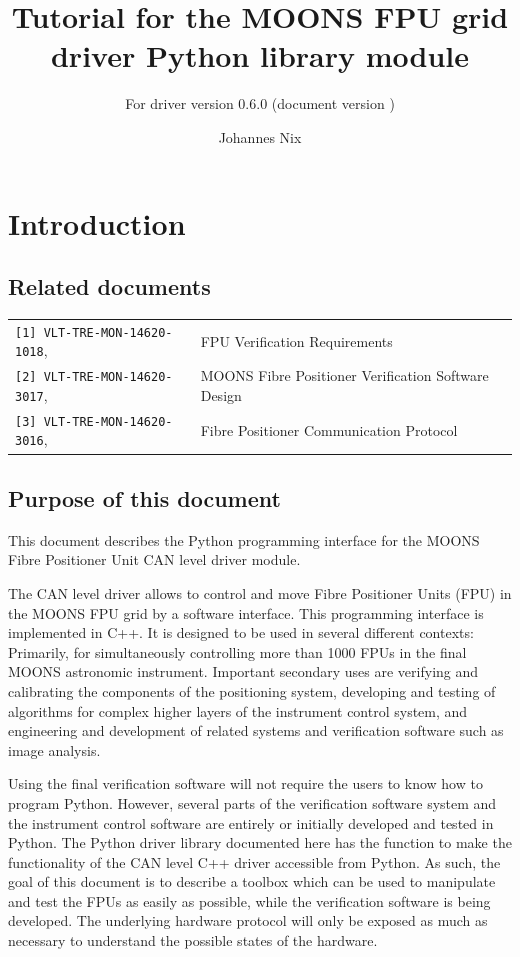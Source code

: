 \documentclass[11pt,a4paper]{scrartcl}
\begin{document}
\title{Tutorial for the MOONS FPU grid driver Python library
  module} \subtitle{For driver version 0.6.0 (document version \texttt{})}

\author{Johannes Nix}

\maketitle

\tableofcontents


\section{Introduction}
\subsection{Related documents}

\begin{tabular}{|ll|}
  \hline
\verb+[1] VLT-TRE-MON-14620-1018+, &  FPU Verification Requirements \\
\verb+[2] VLT-TRE-MON-14620-3017+, & MOONS Fibre Positioner Verification Software Design \\
\verb+[3] VLT-TRE-MON-14620-3016+, & Fibre Positioner Communication Protocol\\
\hline
\end{tabular}


\subsection{Purpose of this document}
This document describes the Python programming interface for the MOONS
Fibre Positioner Unit CAN level driver module.

The CAN level driver allows to control and move Fibre Positioner Units
(FPU) in the MOONS FPU grid by a software interface. This programming
interface is implemented in C++. It is designed to be used in several
different contexts: Primarily, for simultaneously controlling more
than 1000 FPUs in the final MOONS astronomic instrument. Important
secondary uses are verifying and calibrating the components of the
positioning system, developing and testing of algorithms for complex
higher layers of the instrument control system, and engineering and
development of related systems and verification software such as image
analysis.

Using the final verification software will not require the users to
know how to program Python.  However, several parts of the
verification software system and the instrument control software are
entirely or initially developed and tested in Python.  The Python
driver library documented here has the function to make the
functionality of the CAN level C++ driver accessible from Python. As
such, the goal of this document is to describe a toolbox which can be
used to manipulate and test the FPUs as easily as possible, while the
verification software is being developed. The underlying hardware
protocol will only be exposed as much as necessary to understand the
possible states of the hardware.
\end{document}
